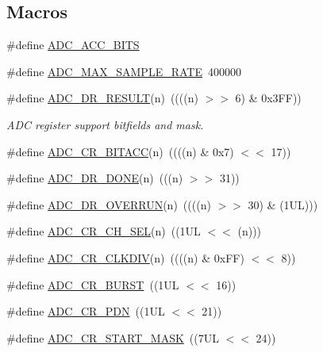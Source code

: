 \subsection*{Macros}
\begin{DoxyCompactItemize}
\item 
\#define \hyperlink{group___a_d_c__18_x_x__43_x_x_gaab7b449ba58f52ff6a32dac1ce8977b2}{A\+D\+C\+\_\+\+A\+C\+C\+\_\+B\+I\+TS}
\item 
\#define \hyperlink{group___a_d_c__18_x_x__43_x_x_ga00fa0a2a80f4f4e40c3f9b3bae7ba200}{A\+D\+C\+\_\+\+M\+A\+X\+\_\+\+S\+A\+M\+P\+L\+E\+\_\+\+R\+A\+TE}~400000
\item 
\#define \hyperlink{group___a_d_c__18_x_x__43_x_x_ga6e5fc80635b66a16e87c6f0eea02bb9e}{A\+D\+C\+\_\+\+D\+R\+\_\+\+R\+E\+S\+U\+LT}(n)~((((n) $>$$>$ 6) \& 0x3\+F\+F))
\begin{DoxyCompactList}\small\item\em A\+DC register support bitfields and mask. \end{DoxyCompactList}\item 
\#define \hyperlink{group___a_d_c__18_x_x__43_x_x_ga0fc24dcecfc18634221ff3d9a5b724fd}{A\+D\+C\+\_\+\+C\+R\+\_\+\+B\+I\+T\+A\+CC}(n)~((((n) \& 0x7) $<$$<$ 17))
\item 
\#define \hyperlink{group___a_d_c__18_x_x__43_x_x_ga43dae5912e092ae5cd2455b69b6f4b00}{A\+D\+C\+\_\+\+D\+R\+\_\+\+D\+O\+NE}(n)~(((n) $>$$>$ 31))
\item 
\#define \hyperlink{group___a_d_c__18_x_x__43_x_x_ga48010d662d45810f9a240b29bbca5700}{A\+D\+C\+\_\+\+D\+R\+\_\+\+O\+V\+E\+R\+R\+UN}(n)~((((n) $>$$>$ 30) \& (1\+U\+L)))
\item 
\#define \hyperlink{group___a_d_c__18_x_x__43_x_x_ga3a6629b2190324c0b6abafc4b720df2e}{A\+D\+C\+\_\+\+C\+R\+\_\+\+C\+H\+\_\+\+S\+EL}(n)~((1\+U\+L $<$$<$ (n)))
\item 
\#define \hyperlink{group___a_d_c__18_x_x__43_x_x_gad2327ec652bedf37c800e077cc46d904}{A\+D\+C\+\_\+\+C\+R\+\_\+\+C\+L\+K\+D\+IV}(n)~((((n) \& 0x\+F\+F) $<$$<$ 8))
\item 
\#define \hyperlink{group___a_d_c__18_x_x__43_x_x_gac4274c705620f3ddd5ba7f73249e6248}{A\+D\+C\+\_\+\+C\+R\+\_\+\+B\+U\+R\+ST}~((1\+U\+L $<$$<$ 16))
\item 
\#define \hyperlink{group___a_d_c__18_x_x__43_x_x_ga7474e4ab5695434acbfe8a5fcad35ef0}{A\+D\+C\+\_\+\+C\+R\+\_\+\+P\+DN}~((1\+U\+L $<$$<$ 21))
\item 
\#define \hyperlink{group___a_d_c__18_x_x__43_x_x_gadb696eab756362a8e2dbc5502f8bdeaf}{A\+D\+C\+\_\+\+C\+R\+\_\+\+S\+T\+A\+R\+T\+\_\+\+M\+A\+SK}~((7\+U\+L $<$$<$ 24))
$$
\end{DoxyCompactItemize}
